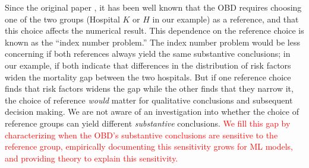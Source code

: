 

Since the original paper \citep{oaxaca1973}, it has been well known that the OBD requires choosing one of the two groups (Hospital $K$ or $H$ in our example) as a reference, and that this choice affects the numerical result.
This dependence on the reference choice is known as the ``index number problem.''
The index number problem would be less concerning if both references always yield the same substantive conclusions;
in our example, if both indicate that differences in the distribution of risk factors widen the mortality gap between the two hospitals.
But if one reference choice finds that risk factors widens the gap while the other finds that they narrow it, the choice of reference \emph{would} matter for qualitative conclusions and subsequent decision making.
We are not aware of an investigation into whether the choice of reference groups can yield different \emph{substantive} conclusions. 
\textcolor{red}{We fill this gap by characterizing when the OBD's substantive conclusions are sensitive to the reference group, empirically documenting this sensitivity grows for ML models, and providing theory to explain this sensitivity.}

